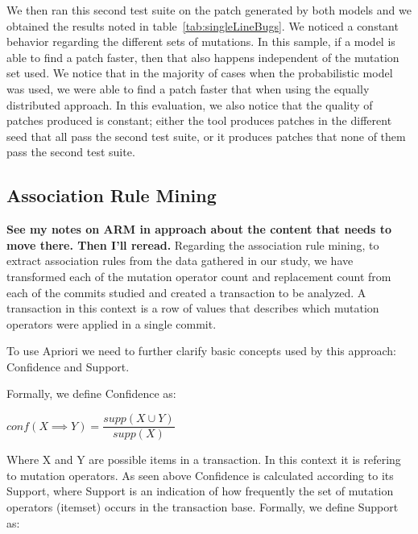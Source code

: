 \documentclass[conference]{IEEEtran}
\newcommand{\todo}[1]
  {{\scriptsize \textbf{\color{red} {#1}}}}
\begin{document}
{We then ran this second test suite on the patch generated by both models and we
obtained the results noted in table~\ref{tab:singleLineBugs}. We noticed a
constant behavior regarding the different sets of mutations. In this sample, if
a model is able to find a patch faster, then that also happens independent of
the mutation set used. We notice that in the majority of cases when the
probabilistic model was used, we were able to find a patch faster that when
using the equally distributed approach. In this evaluation, we also notice that
the quality of patches produced is constant; either the tool produces patches in
the different seed that all pass the second test suite, or it produces patches
that none of them pass the second test suite.  


\subsection{Association Rule Mining} \label{armRes}
\todo{See my notes on ARM in approach about the content that needs to move
  there.  Then I'll reread.}
Regarding the association rule mining, to extract association rules from the data gathered in our study, we 
have transformed each of the mutation operator count and replacement count from 
each of the commits studied and created a transaction to be analyzed. A transaction in this context is a row of values that describes which mutation operators were applied in a single commit.

To use Apriori we need to further clarify basic concepts used by this approach: Confidence and Support.

Formally, we define Confidence as:

\begin{center}
$conf(X \implies Y) = \dfrac{supp(X \cup Y)}{supp(X)}$ 
\end{center}

Where X and Y are possible items in a transaction. In this context it is refering to mutation operators. As seen above Confidence is calculated according to its Support, where Support is an indication of how frequently the set of mutation operators (itemset) occurs in the transaction base.
Formally, we define Support as:

}
\end{document}
